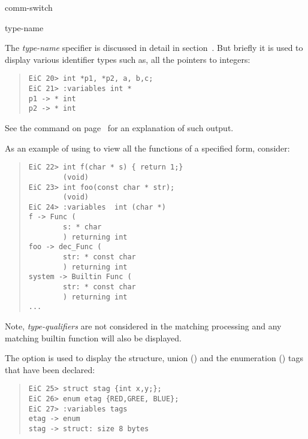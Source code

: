 \begin{Ventry}{comm-switch }
\begin{quote}
\end{quote}

        \begin{Ventry2}{type-name }
        \item[type-name] The {\it type-name} specifier is discussed
        in detail in section~. But briefly
        it is used to display various identifier types such as, 
        all the pointers to integers:

\begin{quote}
\begin{verbatim}
EiC 20> int *p1, *p2, a, b,c;
EiC 21> :variables int *
p1 -> * int 
p2 -> * int 
\end{verbatim}
\end{quote}
        See the  command on page~\pageref{item:show} for
        an explanation of such output.
        
As an example of using  to view all the functions of
a specified form, consider:

\begin{quote}
\begin{verbatim}
EiC 22> int f(char * s) { return 1;}
        (void)
EiC 23> int foo(const char * str);
        (void)
EiC 24> :variables  int (char *)
f -> Func (
        s: * char 
        ) returning int 
foo -> dec_Func (
        str: * const char 
        ) returning int 
system -> Builtin Func (
        str: * const char 
        ) returning int 
...
\end{verbatim}
\end{quote}
Note, {\it type-qualifiers} are not considered in the
matching processing and any matching builtin function will also
be displayed.


\item[tags] 
        The  option is used to display the structure, union
        () and the
        enumeration () tags that have been
        declared:
\begin{quote}
\begin{verbatim}
EiC 25> struct stag {int x,y;};
EiC 26> enum etag {RED,GREE, BLUE};
EiC 27> :variables tags
etag -> enum 
stag -> struct: size 8 bytes
\end{verbatim}
\end{quote}
        \end{Ventry2}
        

\end{Ventry}
